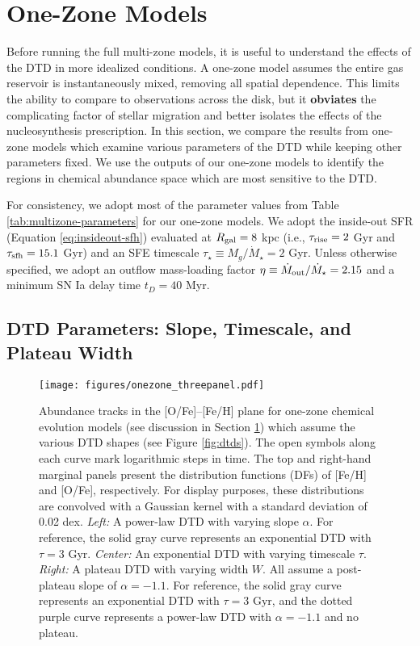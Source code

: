 \documentclass[twocolumn,twocolappendix,linenumbers]{aastex631}
\begin{document}
\section{One-Zone Models}
\label{sec:onezone-results}

Before running the full multi-zone models, it is useful to understand the effects of the DTD in more idealized conditions. A one-zone model assumes the entire gas reservoir is instantaneously mixed, removing all spatial dependence. This limits the ability to compare to observations across the disk, but it {\bf obviates} the complicating factor of stellar migration and better isolates the effects of the nucleosynthesis prescription. In this section, we compare the results from one-zone models which examine various parameters of the DTD while keeping other parameters fixed. We use the outputs of our one-zone models to identify the regions in chemical abundance space which are most sensitive to the DTD.

For consistency, we adopt most of the parameter values from Table \ref{tab:multizone-parameters} for our one-zone models.
We adopt the inside-out SFR (Equation \ref{eq:insideout-sfh}) evaluated at $R_{\rm gal}=8$ kpc (i.e., $\tau_{\rm rise}=2$ Gyr and $\tau_{\rm sfh}=15.1$ Gyr) and an SFE timescale $\tau_\star\equiv M_g/\dot M_\star=2$ Gyr. Unless otherwise specified, we adopt an outflow mass-loading factor $\eta\equiv \dot M_{\rm out}/\dot M_\star=2.15$  and a minimum SN Ia delay time $t_D=40$ Myr. 

\subsection{\bf DTD Parameters: Slope, Timescale, and Plateau Width}
\label{sec:onezone-dtd-params}

\begin{figure*}
    \centering
    \texttt{[image: figures/onezone\_threepanel.pdf]}
    \caption{Abundance tracks in the [O/Fe]--[Fe/H] plane for one-zone chemical evolution models (see discussion in Section \ref{sec:onezone-results}) which assume the various DTD shapes (see Figure \ref{fig:dtds}). The open symbols along each curve mark logarithmic steps in time. The top and right-hand marginal panels present the distribution functions (DFs) of [Fe/H] and [O/Fe], respectively. For display purposes, these distributions are convolved with a Gaussian kernel with a standard deviation of 0.02 dex. 
    \textit{Left:} A power-law DTD with varying slope $\alpha$. For reference, the solid gray curve represents an exponential DTD with $\tau=3$ Gyr. 
    \textit{Center:} An exponential DTD with varying timescale $\tau$. 
    \textit{Right:} A plateau DTD with varying width $W$. All assume a post-plateau slope of $\alpha=-1.1$. For reference, the solid gray curve represents an exponential DTD with $\tau=3$ Gyr, and the dotted purple curve represents a power-law DTD with $\alpha=-1.1$ and no plateau.}
    \label{fig:onezone-threepanel}
\end{figure*}
\end{document}
